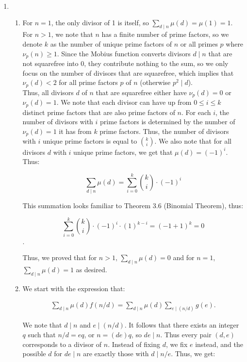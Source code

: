 \documentclass{article}
\begin{document}
\begin{enumerate}[leftmargin=*, label=\arabic*.]
\begin{enumerate}[label=\alph*)]
    
\end{enumerate}
\newpage

\item 
\begin{enumerate}[label=\alph*)]
\item 
For $n = 1$, the only divisor of 1 is itself, so $\sum_{d \mid n} \mu(d) = \mu(1) = 1$. \\

For $n > 1$, we note that $n$ has a finite number of prime factors, so we denote $k$ as the number of unique prime factors of $n$ or all primes $p$ where $\nu_p(n) \geq 1$. Since the Mobius function converts divisors $d \mid n$ that are not squarefree into 0, they contribute nothing to the sum, so we only focus on the number of divisors that are squarefree, which implies that $\nu_p(d) < 2$ for all prime factors $p$ of $n$ (otherwise $p^2 \mid d$). \\

Thus, all divisors $d$ of $n$ that are squarefree either have $\nu_p(d) = 0$ or $\nu_p(d) = 1$. We note that each divisor can have up from $0 \leq i \leq k$ distinct prime factors that are also prime factors of $n$. For each $i$, the number of divisors with $i$ prime factors is determined by the number of $\nu_p(d) = 1$ it has from $k$ prime factors. Thus, the number of divisors with $i$ unique prime factors is equal to $\binom{k}{i}$. We also note that for all divisors $d$ with $i$ unique prime factors, we get that $\mu(d) = (-1)^i$. Thus: 

$$\sum_{d\mid n} \mu(d) = \sum_{i = 0}^k \binom{k}{i} \cdot  (-1)^i$$

This summation looks familiar to Theorem 3.6 (Binomial Theorem), thus:

$$\sum_{i = 0}^k \binom{k}{i} \cdot  (-1)^i\cdot (1)^{k-i} = (-1 + 1)^k = 0$$.

Thus, we proved that for $n > 1$, $\sum_{d\mid n} \mu(d) = 0$ and for $n = 1$, $\sum_{d\mid n} \mu(d) = 1$ as desired. \\


\item 
We start with the expression that: 

\begin{align*}
    \sum_{d \mid n} \mu(d) f(n/d) = \sum_{d \mid n} \mu(d) \sum_{e \mid (n/d)} g(e).
\end{align*}

We note that $d \mid n$ and $e \mid (n / d)$. It follows that there exists an integer $q$ such that $n/d = eq$, or $n = (de)q$, so $de \mid n$. Thus every pair $(d, e)$ corresponds to a divisor of $n$. Instead of fixing $d$, we fix $e$ instead, and the possible $d$ for $de \mid n$ are exactly those with $d \mid n/e$. Thus, we get: 


\end{enumerate}
\end{enumerate}
\end{document}
